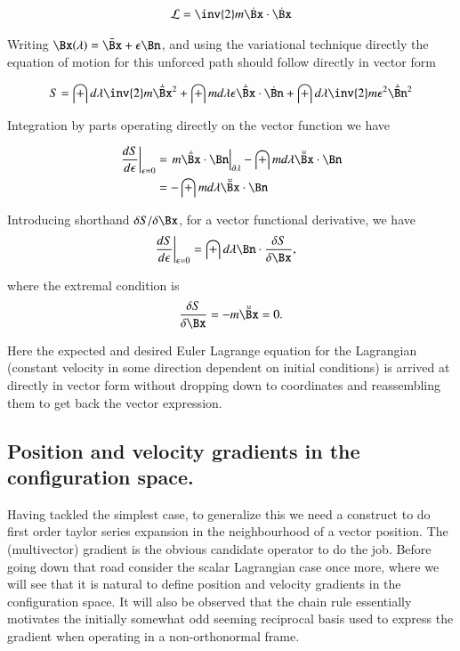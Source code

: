\documentclass{article}
\newcommand{\LL}[0]{\mathcal{L}}
\begin{document}
\begin{align*}
\LL = \inv{2}m \dot{\Bx} \cdot \dot{\Bx}
\end{align*}

Writing $\Bx(\lambda) = \bar{\Bx} + \epsilon \Bn$, and using the variational technique directly the equation of motion for this unforced path should follow directly
in vector form

\begin{align*}
S = \int d\lambda \inv{2} m \dot{\bar{\Bx}}^2 + \int m d\lambda \epsilon \dot{\bar{\Bx}} \cdot \dot{\Bn} + \int d\lambda \inv{2} m \epsilon^2 \dot{\bar{\Bn}}^2
\end{align*}

Integration by parts operating directly on the vector function we have

\begin{align*}
\left.\frac{d S}{d\epsilon}\right\vert_{\epsilon=0} 
&= \left.{m \dot{\bar{\Bx}} \cdot {\Bn}}\right\vert_{\partial \lambda} - \int m d\lambda \ddot{\bar{\Bx}} \cdot {\Bn} \\
&= - \int m d\lambda \ddot{\bar{\Bx}} \cdot {\Bn} \\
\end{align*}

Introducing shorthand $\delta S/\delta \Bx$, for a vector functional derivative, we have
\begin{align*}
\left.\frac{d S}{d\epsilon}\right\vert_{\epsilon=0} &= \int d\lambda \Bn \cdot \frac{\delta S}{\delta \Bx},
\end{align*}

where the extremal condition is
\begin{align*}
\frac{\delta S}{\delta \Bx} = - m \ddot{\bar{\Bx}} = 0.
\end{align*}

Here the expected and desired Euler Lagrange equation for the Lagrangian (constant velocity in some direction dependent on initial conditions) is arrived at directly in vector form without dropping down to coordinates and reassembling them to get back the vector expression.

\subsection{ Position and velocity gradients in the configuration space. }

Having tackled the simplest case, to generalize this we need a construct to do first order taylor series expansion in the neighbourhood of a vector
position.  The (multivector) gradient is the obvious candidate operator to do the job.
Before going down that road consider the scalar Lagrangian case once more, where we will see that it is natural to define position and velocity gradients
in the configuration space.  It will also be observed that the chain rule essentially motivates the initially somewhat odd seeming reciprocal basis
used to express the gradient when operating in a non-orthonormal frame.
\end{document}
